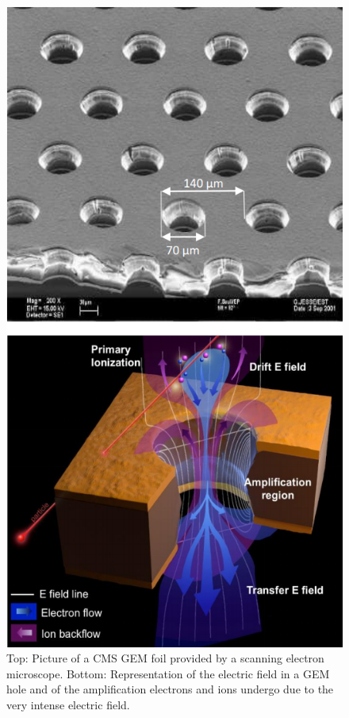\begingroup\setlength{\intextsep}{5pt}\setlength{\columnsep}{15pt}

	\begin{figure}
		\centering
		\includegraphics[width=0.7\linewidth]{fig/chapt3/GEM-foil-ampli.png}
		\caption{\label{fig:GEM-foil} Top: Picture of a CMS GEM foil provided by a scanning electron microscope. Bottom: Representation of the electric field in a GEM hole and of the amplification electrons and ions undergo due to the very intense electric field.}
	\end{figure}
	
